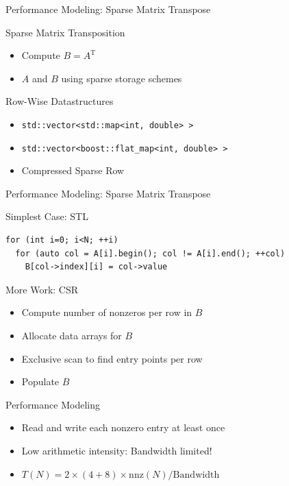 
\begin{frame}[fragile]{Performance Modeling: Sparse Matrix Transpose}
 \begin{block}{Sparse Matrix Transposition}
  \begin{itemize}
   \item Compute $B = A^{\mathrm{T}}$
   \item $A$ and $B$ using sparse storage schemes
  \end{itemize}
 \end{block}   
 
  \begin{block}{Row-Wise Datastructures}
  \begin{itemize}
   \item \lstinline|std::vector<std::map<int, double> >|
   \item \lstinline|std::vector<boost::flat_map<int, double> >|
   \item Compressed Sparse Row
  \end{itemize}
 \end{block}   

\end{frame}



\begin{frame}[fragile]{Performance Modeling: Sparse Matrix Transpose}

 \begin{block}{Simplest Case: STL}
  \begin{lstlisting}
for (int i=0; i<N; ++i)
  for (auto col = A[i].begin(); col != A[i].end(); ++col)
    B[col->index][i] = col->value
  \end{lstlisting}
 \end{block}   
 
  \begin{block}{More Work: CSR}
  \begin{itemize}
   \item Compute number of nonzeros per row in $B$
   \item Allocate data arrays for $B$
   \item Exclusive scan to find entry points per row
   \item Populate $B$
  \end{itemize}
 \end{block}   

   \begin{block}{Performance Modeling}
  \begin{itemize}
   \item Read and write each nonzero entry at least once
   \item Low arithmetic intensity: Bandwidth limited!
   \item $T(N) = 2 \times (4+8) \times \mathrm{nnz}(N) / \mathrm{Bandwidth}$
  \end{itemize}
 \end{block}   

\end{frame}


